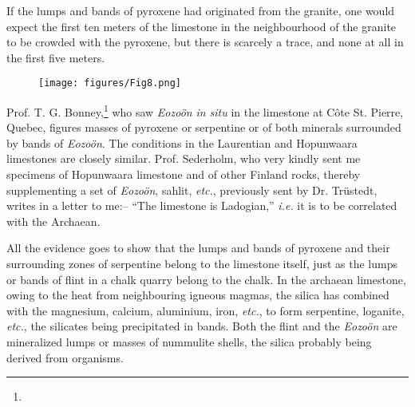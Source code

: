 \documentclass[a4paper, 12pt, oneside]{article}
\begin{document}
If the lumps and bands of pyroxene had originated from the granite, one would expect the first ten meters of the limestone in the neighbourhood of the granite to be crowded with the pyroxene, but there is scarcely a trace, and none at all in the first five meters. 
\begin{figure}[H]
\centering
\texttt{[image: figures/Fig8.png]}
\caption*{}
\end{figure}
Prof. T. G. Bonney,\footnote{} who saw \emph{Eozoön} \emph{in situ} in the limestone at Côte St. Pierre, Quebec, figures masses of pyroxene or serpentine or of both minerals surrounded by bands of \emph{Eozoön}. The conditions in the Laurentian and Hopunwaara limestones are closely similar. Prof. Sederholm, who very kindly sent me specimens of Hopunwaara limestone and of other Finland rocks, thereby supplementing a set of \emph{Eozoön}, sahlit, \emph{etc.}, previously sent by Dr. Trüstedt, writes in a letter to me:-- ``The limestone is Ladogian,'' \emph{i.e.} it is to be correlated with the Archaean.

All the evidence goes to show that the lumps and bands of pyroxene and their surrounding zones of serpentine belong to the limestone itself, just as the lumps or bands of flint in a chalk quarry belong to the chalk. In the archaean limestone, owing to the heat from neighbouring igneous magmas, the silica has combined with the magnesium, calcium, aluminium, iron, \emph{etc.}, to form serpentine, loganite, \emph{etc.}, the silicates being precipitated in bands. Both the flint and the \emph{Eozoön} are mineralized lumps or masses of nummulite shells, the silica probably being derived from organisms.
\end{document}
